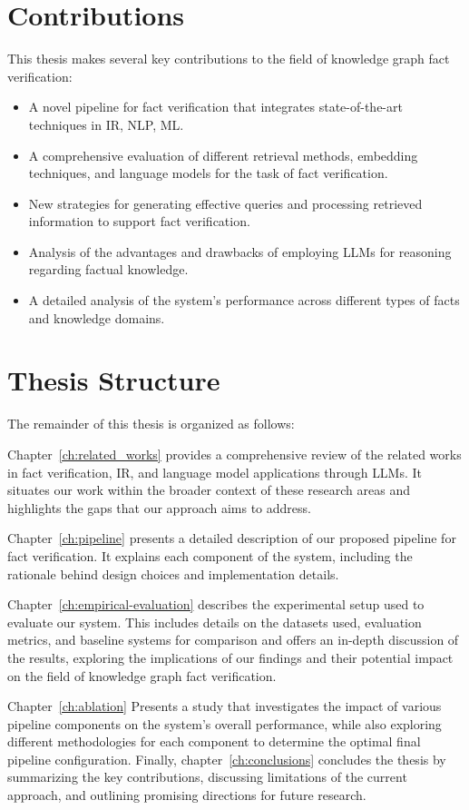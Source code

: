\section{Contributions}\label{sec:contributions}
This thesis makes several key contributions to the field of knowledge graph fact verification:
\begin{itemize}
    \item A novel pipeline for fact verification that integrates state-of-the-art techniques in \ac{IR}, \ac{NLP}, \ac{ML}.
    \item A comprehensive evaluation of different retrieval methods, embedding techniques, and language models for the task of fact verification.
    \item New strategies for generating effective queries and processing retrieved information to support fact verification.
    \item Analysis of the advantages and drawbacks of employing \ac{LLMs} for reasoning regarding factual knowledge.
    \item A detailed analysis of the system's performance across different types of facts and knowledge domains.
\end{itemize}

\section{Thesis Structure}\label{sec:structure}
The remainder of this thesis is organized as follows:

Chapter~\ref{ch:related_works} provides a comprehensive review of the related works in fact verification, \ac{IR}, and language model applications through \ac{LLMs}.
It situates our work within the broader context of these research areas and highlights the gaps that our approach aims to address.

Chapter~\ref{ch:pipeline} presents a detailed description of our proposed pipeline for fact verification.
It explains each component of the system, including the rationale behind design choices and implementation details.

Chapter~\ref{ch:empirical-evaluation} describes the experimental setup used to evaluate our system.
This includes details on the datasets used, evaluation metrics, and baseline systems for comparison and offers an in-depth discussion of the results, exploring the implications of our findings and their potential impact on the field of knowledge graph fact verification.

Chapter~\ref{ch:ablation} Presents a study that investigates the impact of various pipeline components on the system's overall performance, while also exploring different methodologies for each component to determine the optimal final pipeline configuration.
Finally, chapter~\ref{ch:conclusions} concludes the thesis by summarizing the key contributions, discussing limitations of the current approach, and outlining promising directions for future research.

